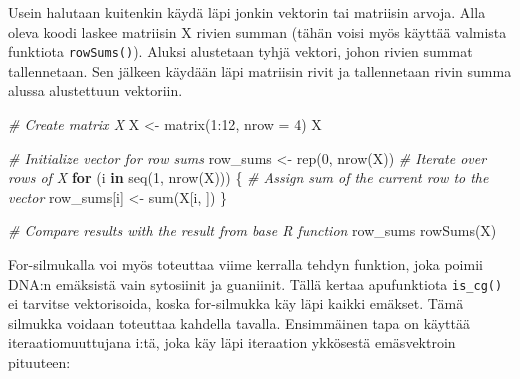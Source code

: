 \documentclass[
]{book}
\newenvironment{Shaded}{\begin{snugshade}}{\end{snugshade}}
\newcommand{\AttributeTok}[1]{\textcolor[rgb]{0.77,0.63,0.00}{#1}}
\newcommand{\CommentTok}[1]{\textcolor[rgb]{0.56,0.35,0.01}{\textit{#1}}}
\newcommand{\ControlFlowTok}[1]{\textcolor[rgb]{0.13,0.29,0.53}{\textbf{#1}}}
\newcommand{\DecValTok}[1]{\textcolor[rgb]{0.00,0.00,0.81}{#1}}
\newcommand{\FunctionTok}[1]{\textcolor[rgb]{0.00,0.00,0.00}{#1}}
\newcommand{\NormalTok}[1]{#1}
\newcommand{\OtherTok}[1]{\textcolor[rgb]{0.56,0.35,0.01}{#1}}
\newcommand{\SpecialCharTok}[1]{\textcolor[rgb]{0.00,0.00,0.00}{#1}}
\begin{document}
Usein halutaan kuitenkin käydä läpi jonkin vektorin tai matriisin arvoja. Alla oleva koodi laskee matriisin X rivien summan (tähän voisi myös käyttää valmista funktiota \texttt{rowSums()}). Aluksi alustetaan tyhjä vektori, johon rivien summat tallennetaan. Sen jälkeen käydään läpi matriisin rivit ja tallennetaan rivin summa alussa alustettuun vektoriin.

\begin{Shaded}
\begin{Highlighting}[]
\CommentTok{\# Create matrix X}
\NormalTok{X }\OtherTok{\textless{}{-}} \FunctionTok{matrix}\NormalTok{(}\DecValTok{1}\SpecialCharTok{:}\DecValTok{12}\NormalTok{, }\AttributeTok{nrow =} \DecValTok{4}\NormalTok{)}
\NormalTok{X}

\CommentTok{\# Initialize vector for row sums}
\NormalTok{row\_sums }\OtherTok{\textless{}{-}} \FunctionTok{rep}\NormalTok{(}\DecValTok{0}\NormalTok{, }\FunctionTok{nrow}\NormalTok{(X))}
\CommentTok{\# Iterate over rows of X}
\ControlFlowTok{for}\NormalTok{ (i }\ControlFlowTok{in} \FunctionTok{seq}\NormalTok{(}\DecValTok{1}\NormalTok{, }\FunctionTok{nrow}\NormalTok{(X))) \{}
  \CommentTok{\# Assign sum of the current row to the vector}
\NormalTok{  row\_sums[i] }\OtherTok{\textless{}{-}} \FunctionTok{sum}\NormalTok{(X[i, ])}
\NormalTok{\}}

\CommentTok{\# Compare results with the result from base R function}
\NormalTok{row\_sums}
\FunctionTok{rowSums}\NormalTok{(X)}
\end{Highlighting}
\end{Shaded}

For-silmukalla voi myös toteuttaa viime kerralla tehdyn funktion, joka poimii DNA:n emäksistä vain sytosiinit ja guaniinit. Tällä kertaa apufunktiota \texttt{is\_cg()} ei tarvitse vektorisoida, koska for-silmukka käy läpi kaikki emäkset. Tämä silmukka voidaan toteuttaa kahdella tavalla. Ensimmäinen tapa on käyttää iteraatiomuuttujana i:tä, joka käy läpi iteraation ykkösestä emäsvektroin pituuteen:
\end{document}
